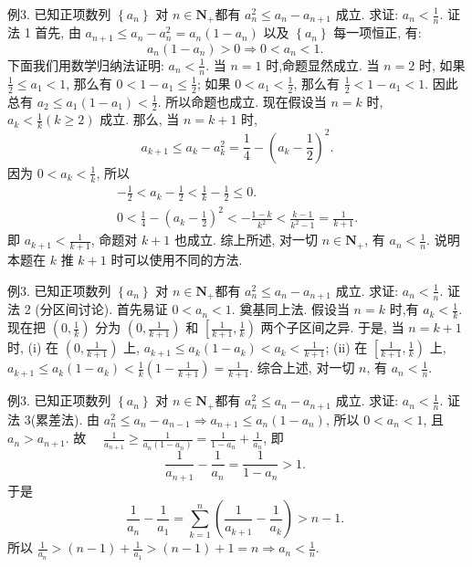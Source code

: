 例3. 已知正项数列 $\left\{a_n\right\}$ 对 $n \in \mathbf{N}_{+}$都有 $a_n^2 \leqslant a_n-a_{n+1}$ 成立.
求证: $a_n<\frac{1}{n}$.
证法 1 首先, 由 $a_{n+1} \leqslant a_n-a_n^2=a_n\left(1-a_n\right)$ 以及 $\left\{a_n\right\}$ 每一项恒正, 有:
$$
a_n\left(1-a_n\right)>0 \Rightarrow 0<a_n<1 \text {. }
$$
下面我们用数学归纳法证明: $a_n<\frac{1}{n}$.
当 $n=1$ 时,命题显然成立.
当 $n=2$ 时, 如果 $\frac{1}{2} \leqslant a_1<1$, 那么有 $0<1-a_1 \leqslant \frac{1}{2}$; 如果 $0<a_1<\frac{1}{2}$, 那么有 $\frac{1}{2}<1-a_1<1$. 因此总有 $a_2 \leqslant a_1\left(1-a_1\right)<\frac{1}{2}$. 所以命题也成立.
现在假设当 $n=k$ 时, $a_k<\frac{1}{k}(k \geqslant 2)$ 成立.
那么, 当 $n=k+1$ 时,
$$
a_{k+1} \leqslant a_k-a_k^2=\frac{1}{4}-\left(a_k-\frac{1}{2}\right)^2 .
$$
因为 $0<a_k<\frac{1}{k}$, 所以
$$
\begin{gathered}
-\frac{1}{2}<a_k-\frac{1}{2}<\frac{1}{k}-\frac{1}{2} \leqslant 0 . \\
0<\frac{1}{4}-\left(a_k-\frac{1}{2}\right)^2<-\frac{1-k}{k^2}<\frac{k-1}{k^2-1}=\frac{1}{k+1} .
\end{gathered}
$$
即 $a_{k+1}<\frac{1}{k+1}$, 命题对 $k+1$ 也成立.
综上所述, 对一切 $n \in \mathbf{N}_{+}$, 有 $a_n<\frac{1}{n}$.
说明本题在 $k$ 推 $k+1$ 时可以使用不同的方法.



例3. 已知正项数列 $\left\{a_n\right\}$ 对 $n \in \mathbf{N}_{+}$都有 $a_n^2 \leqslant a_n-a_{n+1}$ 成立.
求证: $a_n<\frac{1}{n}$.
证法 2 (分区间讨论). 首先易证 $0<a_n<1$. 奠基同上法.
假设当 $n=k$ 时,有 $a_k<\frac{1}{k}$.
现在把 $\left(0, \frac{1}{k}\right)$ 分为 $\left(0, \frac{1}{k+1}\right)$ 和 $\left[\frac{1}{k+1}, \frac{1}{k}\right)$ 两个子区间之异.
于是, 当 $n=k+1$ 时,
(i) 在 $\left(0, \frac{1}{k+1}\right)$ 上, $a_{k+1} \leqslant a_k\left(1-a_k\right)<a_k<\frac{1}{k+1}$;
(ii) 在 $\left[\frac{1}{k+1}, \frac{1}{k}\right)$ 上, $a_{k+1} \leqslant a_k\left(1-a_k\right)<\frac{1}{k}\left(1-\frac{1}{k+1}\right)=\frac{1}{k+1}$.
综合上述, 对一切 $n$, 有 $a_n<\frac{1}{n}$.



例3. 已知正项数列 $\left\{a_n\right\}$ 对 $n \in \mathbf{N}_{+}$都有 $a_n^2 \leqslant a_n-a_{n+1}$ 成立.
求证: $a_n<\frac{1}{n}$.
证法 3(累差法).
由 $a_n^2 \leqslant a_n-a_{n-1} \Rightarrow a_{n+1} \leqslant a_n\left(1-a_n\right)$, 所以 $0<a_n<1$, 且 $a_n>a_{n+1}$.
故 $\quad \frac{1}{a_{n+1}} \geqslant \frac{1}{a_n\left(1-a_n\right)}=\frac{1}{1-a_n}+\frac{1}{a_n}$,
即
$$
\frac{1}{a_{n+1}}-\frac{1}{a_n}=\frac{1}{1-a_n}>1 \text {. }
$$
于是
$$
\frac{1}{a_n}-\frac{1}{a_1}=\sum_{k=1}^n\left(\frac{1}{a_{k+1}}-\frac{1}{a_k}\right)>n-1 \text {. }
$$
所以 $\frac{1}{a_n}>(n-1)+\frac{1}{a_1}>(n-1)+1=n \Rightarrow a_n<\frac{1}{n}$.



